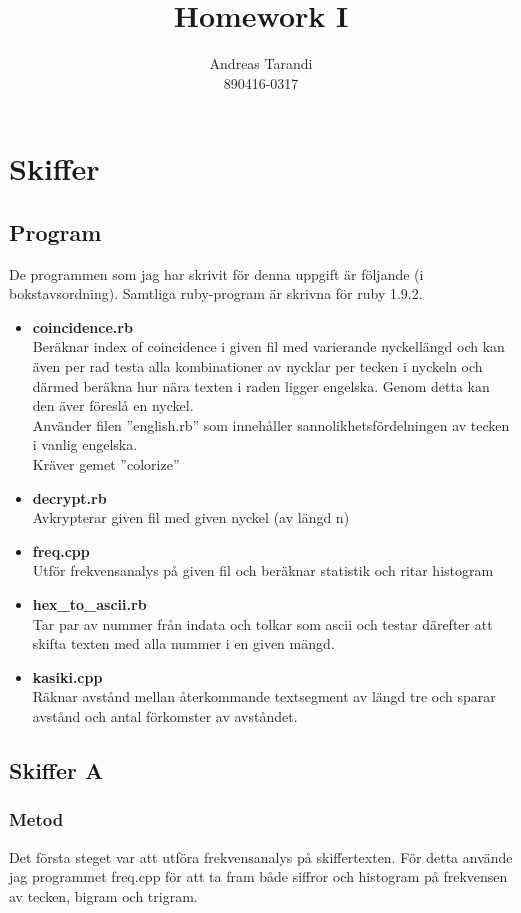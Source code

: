 \documentclass[a4paper,11pt]{article}
\author{Andreas Tarandi\\890416-0317}
\title{Homework I}
\begin{document}
	\maketitle

	\section{Skiffer}
		\subsection{Program}
			De programmen som jag har skrivit för denna uppgift är följande (i bokstavsordning). Samtliga ruby-program är skrivna för ruby 1.9.2.
			\begin{itemize}
				\item \textbf{coincidence.rb}	\\
					Beräknar index of coincidence i given fil med varierande nyckellängd och kan även per rad testa alla kombinationer av nycklar per tecken i nyckeln och därmed beräkna hur nära texten i raden ligger engelska. Genom detta kan den äver föreslå en nyckel.\\
					Använder filen ''english.rb'' som innehåller sannolikhetsfördelningen av tecken i vanlig engelska.
					\\
					Kräver gemet ''colorize''	
				\item \textbf{decrypt.rb}	\\
					Avkrypterar given fil med given nyckel (av längd n)
				\item \textbf{freq.cpp}\\
					Utför frekvensanalys på given fil och beräknar statistik och ritar histogram
				\item \textbf{hex\_to\_ascii.rb}\\
					Tar par av nummer från indata och tolkar som ascii och testar därefter att skifta texten med alla nummer i en given mängd. 
				\item \textbf{kasiki.cpp}	\\
					Räknar avstånd mellan återkommande textsegment av längd tre och sparar avstånd och antal förkomster av avståndet.
			\end{itemize}

		\subsection{Skiffer A}
			\subsubsection{Metod}
			Det första steget var att utföra frekvensanalys på skiffertexten. För detta använde jag programmet freq.cpp för att 
			ta fram både siffror och histogram på frekvensen av tecken, bigram och trigram.
\end{document}

